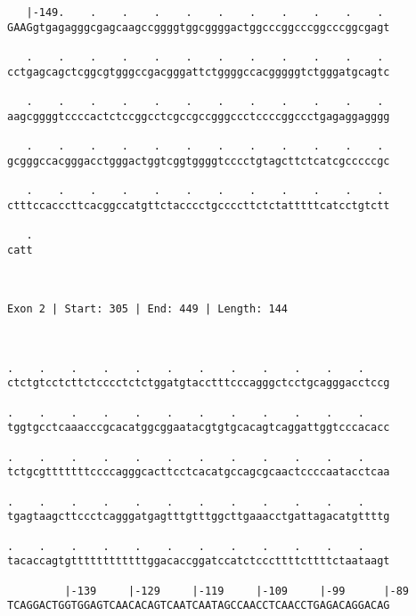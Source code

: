 \documentclass{article}
\begin{document}
\begin{Verbatim}
   |-149.    .    .    .    .    .    .    .    .    .    . 
GAAGgtgagagggcgagcaagccggggtggcggggactggcccggcccggcccggcgagt
                                                            
   .    .    .    .    .    .    .    .    .    .    .    . 
cctgagcagctcggcgtgggccgacgggattctggggccacgggggtctgggatgcagtc
                                                            
   .    .    .    .    .    .    .    .    .    .    .    . 
aagcggggtccccactctccggcctcgccgccgggccctccccggccctgagaggagggg
                                                            
   .    .    .    .    .    .    .    .    .    .    .    . 
gcgggccacgggacctgggactggtcggtggggtcccctgtagcttctcatcgcccccgc
                                                            
   .    .    .    .    .    .    .    .    .    .    .    . 
ctttccacccttcacggccatgttctacccctgccccttctctatttttcatcctgtctt
                                                            
   .
catt
    
    
 
Exon 2 | Start: 305 | End: 449 | Length: 144



.    .    .    .    .    .    .    .    .    .    .    .    
ctctgtcctcttctcccctctctggatgtacctttcccagggctcctgcagggacctccg
                                                            
.    .    .    .    .    .    .    .    .    .    .    .    
tggtgcctcaaacccgcacatggcggaatacgtgtgcacagtcaggattggtcccacacc
                                                            
.    .    .    .    .    .    .    .    .    .    .    .    
tctgcgtttttttccccagggcacttcctcacatgccagcgcaactccccaatacctcaa
                                                            
.    .    .    .    .    .    .    .    .    .    .    .    
tgagtaagcttccctcagggatgagtttgtttggcttgaaacctgattagacatgttttg
                                                            
.    .    .    .    .    .    .    .    .    .    .    .    
tacaccagtgttttttttttttggacaccggatccatctcccttttcttttctaataagt
                                                            
         |-139     |-129     |-119     |-109     |-99      |-89
TCAGGACTGGTGGAGTCAACACAGTCAATCAATAGCCAACCTCAACCTGAGACAGGACAG
                                                            

\end{Verbatim}
\end{document}
